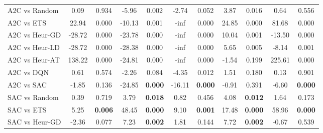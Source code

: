 \begin{tabular}{lcccccccccc}
	\midrule 
	A2C vs Random    & 0.09            & 0.934                 & -5.96          & 0.002                  & -2.74          & 0.052                  & 3.87           & 0.016                  & 0.64           & 0.556                  \\
	A2C vs ETS       & 22.94           & 0.000                 & -10.13         & 0.001                  & -inf           & 0.000                  & 24.85          & 0.000                  & 81.68          & 0.000                  \\
	A2C vs Heur-GD   & -28.72          & 0.000                 & -23.78         & 0.000                  & -inf           & 0.000                  & 10.04          & 0.001                  & -13.50         & 0.000                  \\
	A2C vs Heur-LD   & -28.72          & 0.000                 & -28.38         & 0.000                  & -inf           & 0.000                  & 5.65           & 0.005                  & -8.14          & 0.001                  \\
	A2C vs Heur-AT   & 138.22          & 0.000                 & -24.81         & 0.000                  & -inf           & 0.000                  & -1.54          & 0.199                  & 225.61         & 0.000                  \\
	A2C vs DQN       & 0.61            & 0.574                 & -2.26          & 0.084                  & -4.35          & 0.012                  & 1.51           & 0.180                  & 0.13           & 0.901                  \\
	A2C vs SAC       & -1.85           & 0.136                 & -24.85         & \textbf{0.000}         & -16.11         & \textbf{0.000}         & -0.91          & 0.391                  & -6.60          & \textbf{0.000}         \\
	\midrule 
	SAC vs Random    & 0.39            & 0.719                 & 3.79           & \textbf{0.018}         & 0.82           & 0.456                  & 4.08           & \textbf{0.012}         & 1.64           & 0.173                  \\
	SAC vs ETS       & 5.25            & \textbf{0.006}        & 48.45          & \textbf{0.000}         & 9.10           & \textbf{0.001}         & 17.48          & \textbf{0.000}         & 58.96          & \textbf{0.000}         \\
	SAC vs Heur-GD   & -2.36           & 0.077                 & 7.23           & \textbf{0.002}         & 1.81           & 0.144                  & 7.72           & \textbf{0.002}         & -0.67          & 0.539                  \\

\end{tabular}
